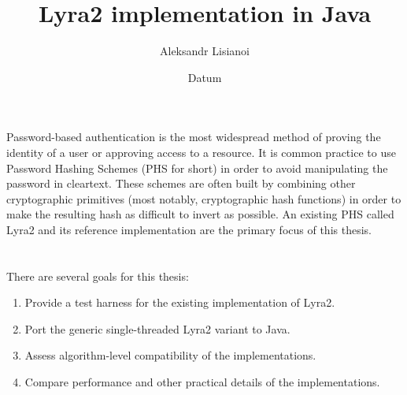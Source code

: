 \documentclass[a4paper,10pt,english]{INSOexpose}
\title{Lyra2 implementation in Java}
\author{Aleksandr Lisianoi}
\date{Datum}
\begin{document}
\maketitle

\section{}

Password-based authentication is the most widespread method of proving the identity of a user or approving access to a resource. It is common practice to use Password Hashing Schemes (PHS for short) in order to avoid manipulating the password in cleartext. These schemes are often built by combining other cryptographic primitives (most notably, cryptographic hash functions) in order to make the resulting hash as difficult to invert as possible. An existing PHS called Lyra2 \cite{Andrade:2016:Lyra2} and its reference implementation are the primary focus of this thesis. 

\section{}

There are several goals for this thesis:

\begin{enumerate}
\item Provide a test harness for the existing implementation of Lyra2.
\item Port the generic single-threaded Lyra2 variant to Java.
\item Assess algorithm-level compatibility of the implementations.
\item Compare performance and other practical details of the implementations.
\end{enumerate}

\section{}
\end{document}
